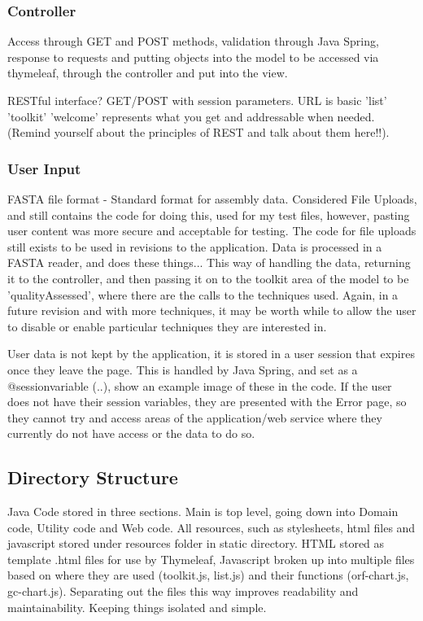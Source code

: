\subsubsection{Controller}
Access through GET and POST methods, validation through Java Spring, response to requests and putting objects into the model to be accessed via thymeleaf, through the controller and put into the view. 

RESTful interface? GET/POST with session parameters. URL is basic 'list' 'toolkit' 'welcome' represents what you get and addressable when needed. (Remind yourself about the principles of REST and talk about them here!!).

\subsubsection{User Input}
FASTA file format - Standard format for assembly data.
Considered File Uploads, and still contains the code for doing this, used for my test files, however, pasting user content was more secure and acceptable for testing. The code for file uploads still exists to be used in revisions to the application.
Data is processed in a FASTA reader, and does these things...
This way of handling the data, returning it to the controller, and then passing it on to the toolkit area of the model to be 'qualityAssessed', where there are the calls to the techniques used. Again, in a future revision and with more techniques, it may be worth while to allow the user to disable or enable particular techniques they are interested in.

User data is not kept by the application, it is stored in a user session that expires once they leave the page. This is handled by Java Spring, and set as a @sessionvariable (..), show an example image of these in the code. If the user does not have their session variables, they are presented with the Error page, so they cannot try and access areas of the application/web service where they currently do not have access or the data to do so.

\subsection{Directory Structure}
Java Code stored in three sections. Main is top level, going down into Domain code, Utility code and Web code. All resources, such as stylesheets, html files and javascript stored under resources folder in static directory. HTML stored as template .html files for use by Thymeleaf, Javascript broken up into multiple files based on where they are used (toolkit.js, list.js) and their functions (orf-chart.js, gc-chart.js). Separating out the files this way improves readability and maintainability. Keeping things isolated and simple.


